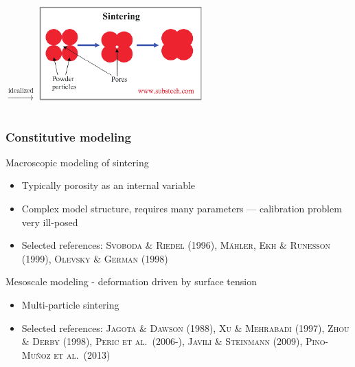 \documentclass[11pt]{beamer} %
\newcommand{\roughcite}[1]{\textsc{#1}}
\begin{document}
\begin{frame}
\begin{center}
\begin{columns}
\begin{tikzpicture}
 \end{tikzpicture}
 \centering
 $\xrightarrow{\text{idealized}}$
 \centering
 \includegraphics[width=\textwidth]{figures/sinter_2-crop.pdf}
 \end{columns}
\end{center}
\end{frame}


\begin{frame}
 \frametitle{Constitutive modeling}
 Macroscopic modeling of sintering
 \begin{itemize}
  \item Typically porosity as an internal variable
  \item Complex model structure, requires many parameters --- calibration problem very ill-posed
  \item Selected references: \roughcite{Svoboda \& Riedel (1996)}, \roughcite{Mähler, Ekh \& Runesson (1999)}, \roughcite{Olevsky \& German (1998)}
 \end{itemize}

Mesoscale modeling - deformation driven by surface tension
 \begin{itemize}
  \item Multi-particle sintering
  \item Selected references: \roughcite{Jagota \& Dawson (1988)}, \roughcite{Xu \& Mehrabadi (1997)}, \roughcite{Zhou \& Derby (1998)}, \roughcite{Peric et al.\ (2006-)}, \roughcite{Javili \& Steinmann (2009)}, \roughcite{Pino-Muñoz et al.\ (2013)}
 \end{itemize}

\end{frame}
\end{document}
